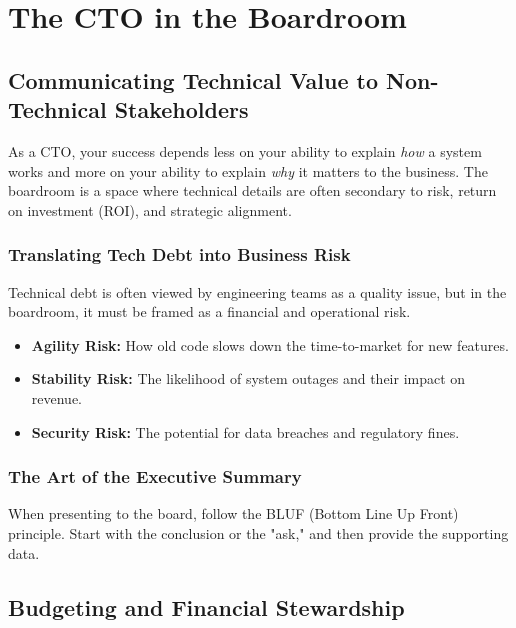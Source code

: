 \chapter{The CTO in the Boardroom}


\section{Communicating Technical Value to Non-Technical Stakeholders}

As a CTO, your success depends less on your ability to explain \textit{how} a system works and more on your ability to explain \textit{why} it matters to the business. The boardroom is a space where technical details are often secondary to risk, return on investment (ROI), and strategic alignment.

\subsection{Translating Tech Debt into Business Risk}

Technical debt is often viewed by engineering teams as a quality issue, but in the boardroom, it must be framed as a financial and operational risk.

\begin{itemize}
    \item \textbf{Agility Risk:} How old code slows down the time-to-market for new features.
    \item \textbf{Stability Risk:} The likelihood of system outages and their impact on revenue.
    \item \textbf{Security Risk:} The potential for data breaches and regulatory fines.
\end{itemize}

\subsection{The Art of the Executive Summary}

When presenting to the board, follow the BLUF (Bottom Line Up Front) principle. Start with the conclusion or the "ask," and then provide the supporting data.

\section{Budgeting and Financial Stewardship}

